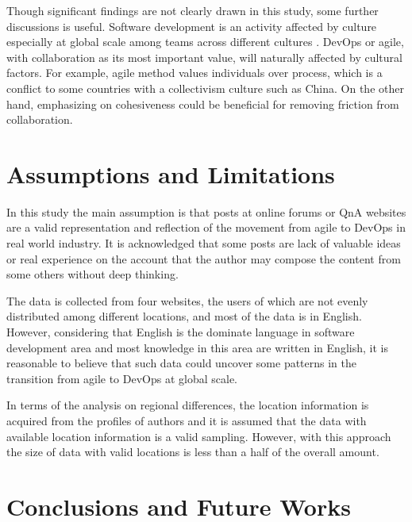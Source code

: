 \documentclass[
  12pt,
  a4paper,
]{article}
\begin{document}
Though significant findings are not clearly drawn in this study, some
further discussions is useful. Software development is an activity
affected by culture especially at global scale among teams across
different cultures \citep{olsen:2003}. DevOps or agile, with
collaboration as its most important value, will naturally affected by
cultural factors. For example, agile method values individuals over
process, which is a conflict to some countries with a collectivism
culture such as China. On the other hand, emphasizing on cohesiveness
could be beneficial for removing friction from collaboration.

\hypertarget{sec:ass}{%
\section{Assumptions and Limitations}\label{sec:ass}}

In this study the main assumption is that posts at online forums or QnA
websites are a valid representation and reflection of the movement from
agile to DevOps in real world industry. It is acknowledged that some
posts are lack of valuable ideas or real experience on the account that
the author may compose the content from some others without deep
thinking.

The data is collected from four websites, the users of which are not
evenly distributed among different locations, and most of the data is in
English. However, considering that English is the dominate language in
software development area and most knowledge in this area are written in
English, it is reasonable to believe that such data could uncover some
patterns in the transition from agile to DevOps at global scale.

In terms of the analysis on regional differences, the location
information is acquired from the profiles of authors and it is assumed
that the data with available location information is a valid sampling.
However, with this approach the size of data with valid locations is
less than a half of the overall amount.

\hypertarget{sec:concl}{%
\section{Conclusions and Future Works}\label{sec:concl}}
\end{document}
